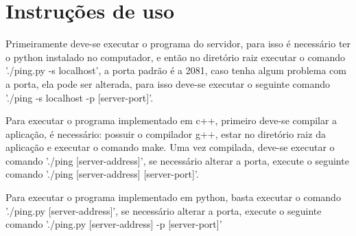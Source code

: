 \section{Instruções de uso}

    Primeiramente deve-se executar o programa do servidor, para isso é
    necessário ter o python instalado no computador, e então no diretório raiz
    executar o comando './ping.py -s localhost', a porta padrão é a 2081,
    caso tenha algum problema com a porta, ela pode ser alterada, para isso
    deve-se executar o seguinte comando './ping -s localhost -p [server-port]'.

    Para executar o programa implementado em c++, primeiro deve-se compilar a
    aplicação, é necessário: possuir o compilador g++, estar no diretório raiz
    da aplicação e executar o comando make. Uma vez compilada, deve-se executar
    o comando './ping [server-address]', se necessário alterar a porta, execute
    o seguinte comando './ping [server-address] [server-port]'.

    Para executar o programa implementado em python, basta executar o comando
    './ping.py [server-address]', se necessário alterar a porta, execute o
    seguinte comando './ping.py [server-address] -p [server-port]'
